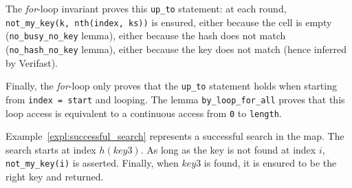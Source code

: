 \documentclass[oneside]{article}
\newcommand{\keyvalue}[2] {
	\begin{tabular}{| p{0.8cm} | p{1.3cm} |}
			\hline
			\texttt{#1} & \texttt{#2} \\
			\hline
		\end{tabular}
}
\begin{document}
The \emph{for}-loop invariant proves this \texttt{up\_to} statement: at each round, \texttt{not\_my\_key(k, nth(index, ks))} is ensured, either because the cell is empty (\texttt{no\_busy\_no\_key} lemma), either because the hash does not match (\texttt{no\_hash\_no\_key} lemma), either because the key does not match (hence inferred by Verifast). 

Finally, the \emph{for}-loop only proves that the \texttt{up\_to} statement holds when starting from \texttt{index = start} and looping. The lemma \texttt{by\_loop\_for\_all} proves that this loop access is equivalent to a continuous access from \texttt{0} to \texttt{length}.

Example~\ref{expl:successful_search} represents a successful search in the map. The search starts at index $h(key3)$. As long as the key is not found at index $i$, \texttt{not\_my\_key(i)} is asserted. Finally, when $key3$ is found, it is ensured to be the right key and returned. 

\begin{example}
	\label{expl:successful_search}
	\begin{center}
	\end{center}
\end{example}
\end{document}

